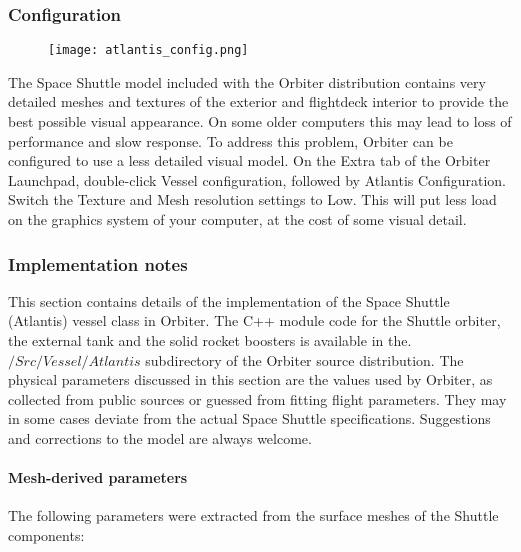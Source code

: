 \documentclass[Orbiter User Manual.tex]{subfiles}
\begin{document}
\subsubsection{Configuration}

\begin{figure}[H]
  \centering
  \texttt{[image: atlantis\_config.png]}
\end{figure}

\noindent
The Space Shuttle model included with the Orbiter distribution contains very detailed meshes and textures of the exterior and flightdeck interior to provide the best possible visual appearance. On some older computers this may lead to loss of performance and slow response. To address this problem, Orbiter can be configured to use a less detailed visual model.
On the Extra tab of the Orbiter Launchpad, double-click Vessel configuration, followed by Atlantis Configuration. Switch the Texture and Mesh resolution settings to Low. This will put less load on the graphics system of your computer, at the cost of some visual detail.

\subsubsection{Implementation notes}
This section contains details of the implementation of the Space Shuttle (Atlantis) vessel class in Orbiter. The C++ module code for the Shuttle orbiter, the external tank and the solid rocket boosters is available in the.$/Src/Vessel/Atlantis$ subdirectory of the Orbiter source distribution. The physical parameters discussed in this section are the values used by Orbiter, as collected from public sources or guessed from fitting flight parameters. They may in some cases deviate from the actual Space Shuttle specifications. Suggestions and corrections to the model are always welcome.

\paragraph{Mesh-derived parameters}
The following parameters were extracted from the surface meshes of the Shuttle components:
\end{document}
